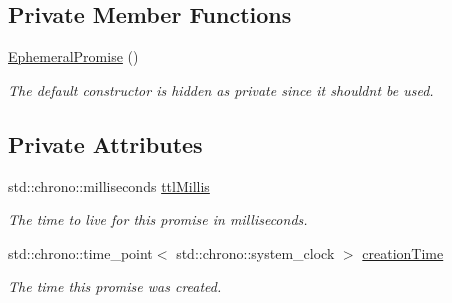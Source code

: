 \subsection*{Private Member Functions}
\begin{DoxyCompactItemize}
\item 
\mbox{\label{class_aws_1_1_iot_1_1_device_client_1_1_jobs_1_1_ephemeral_promise_aed6485529175850ccbd949dd6e9f2afe}} 
\hyperlink{class_aws_1_1_iot_1_1_device_client_1_1_jobs_1_1_ephemeral_promise_aed6485529175850ccbd949dd6e9f2afe}{Ephemeral\+Promise} ()
\begin{DoxyCompactList}\small\item\em The default constructor is hidden as private since it shouldn\textquotesingle{}t be used. \end{DoxyCompactList}\end{DoxyCompactItemize}
\subsection*{Private Attributes}
\begin{DoxyCompactItemize}
\item 
\mbox{\label{class_aws_1_1_iot_1_1_device_client_1_1_jobs_1_1_ephemeral_promise_a3cd168edb7d7de52f978aa6b431ae8c0}} 
std\+::chrono\+::milliseconds \hyperlink{class_aws_1_1_iot_1_1_device_client_1_1_jobs_1_1_ephemeral_promise_a3cd168edb7d7de52f978aa6b431ae8c0}{ttl\+Millis}
\begin{DoxyCompactList}\small\item\em The time to live for this promise in milliseconds. \end{DoxyCompactList}\item 
\mbox{\label{class_aws_1_1_iot_1_1_device_client_1_1_jobs_1_1_ephemeral_promise_a7c1a4893c3cae960fa8ed42279d93b73}} 
std\+::chrono\+::time\+\_\+point$<$ std\+::chrono\+::system\+\_\+clock $>$ \hyperlink{class_aws_1_1_iot_1_1_device_client_1_1_jobs_1_1_ephemeral_promise_a7c1a4893c3cae960fa8ed42279d93b73}{creation\+Time}
\begin{DoxyCompactList}\small\item\em The time this promise was created. \end{DoxyCompactList}\end{DoxyCompactItemize}


